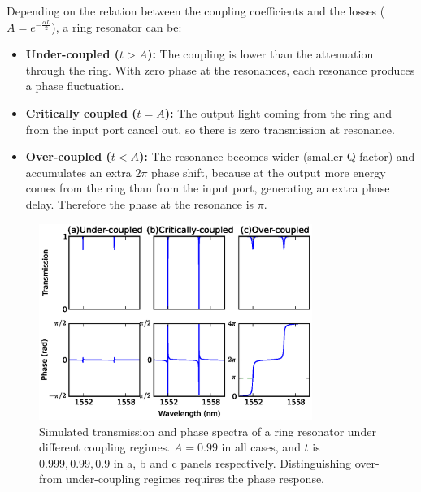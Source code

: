 \documentclass[journal]{IEEEtran}
\newcommand{\fwidthBig}{3.5in}
\begin{document}
Depending on the relation between the coupling coefficients and the losses ($A=e^{-\frac{\alpha L}{2}}$), a ring resonator can be:

\begin{itemize}
 \item \textbf{Under-coupled ($t>A$):} The coupling is lower than the attenuation through the ring.
 With zero phase at the resonances, each resonance produces a phase fluctuation. 

 \item \textbf{Critically coupled ($t=A$):} The output light coming from the ring and from the input port cancel out, so there is zero transmission at resonance.

 
 \item \textbf{Over-coupled ($t<A$):} The resonance becomes wider (smaller Q-factor) and accumulates an extra $2\pi$ phase shift, because at the output more energy comes from the ring than from the input port, generating an extra phase delay.
 Therefore the phase at the resonance is $\pi$.
\end{itemize}

 

\begin{figure}[htb]
    \centering
    \includegraphics[width=\fwidthBig]{ringCouplingRegimes}
    \caption{Simulated transmission and phase spectra of a ring resonator under different coupling regimes.
    $A= 0.99$ in all cases, and $t$ is $0.999, 0.99, 0.9$ in a, b and c panels respectively.
    Distinguishing over- from under-coupling regimes requires the phase response.}
    \label{fig:ringDifferentCoupling}
\end{figure}
\end{document}
